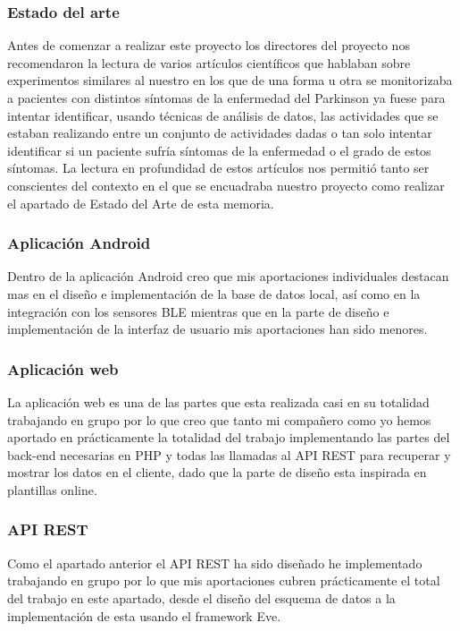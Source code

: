 \documentclass[11pt,spanish]{article}
\begin{document}
\subsubsection{Estado del arte}
Antes de comenzar a realizar este proyecto los directores del proyecto nos recomendaron la lectura de varios artículos científicos que hablaban sobre experimentos similares al nuestro en los que de una forma u otra se monitorizaba a pacientes con distintos síntomas de la enfermedad del Parkinson ya fuese para intentar identificar, usando técnicas de análisis de datos, las actividades que se estaban realizando entre un conjunto de actividades dadas o tan solo intentar identificar si un paciente sufría síntomas de la enfermedad o el grado de estos síntomas. La lectura en profundidad de estos artículos nos permitió tanto ser conscientes del contexto en el que se encuadraba nuestro proyecto como realizar el apartado de Estado del Arte de esta memoria. 

\subsubsection{Aplicación Android}

Dentro de la aplicación Android creo que mis aportaciones individuales destacan mas en el diseño e implementación de la base de datos local, así como en la integración con los sensores BLE mientras que en la parte de diseño e implementación de la interfaz de usuario mis aportaciones han sido menores.

\subsubsection{Aplicación web}
La aplicación web es una de las partes que esta realizada casi en su totalidad trabajando en grupo por lo que creo que tanto mi compañero como yo hemos aportado en prácticamente la totalidad del trabajo implementando las partes del back-end necesarias en PHP y todas las llamadas al API REST para recuperar y mostrar los datos en el cliente, dado que la parte de diseño esta inspirada en plantillas online.

\subsubsection{API REST}
Como el apartado anterior el API REST ha sido diseñado he implementado trabajando en grupo por lo que mis aportaciones cubren prácticamente el total del trabajo en este apartado, desde el diseño del esquema de datos a la implementación de esta usando el framework Eve.
\end{document}
